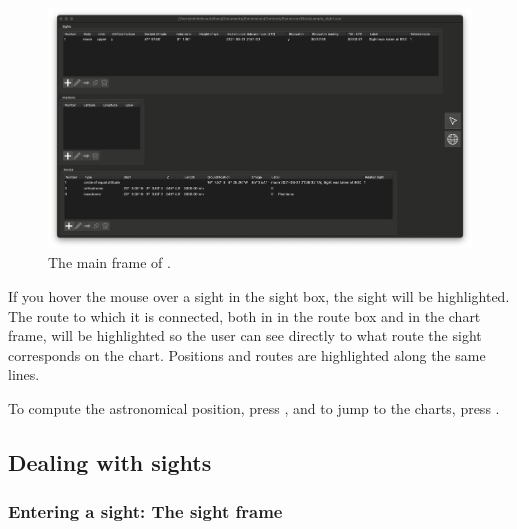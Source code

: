 \documentclass{ol-softwaremanual}
\begin{document}
\begin{figure}
  \centering
  \includegraphics[width=1\textwidth]{figures/list-frame.png}
  \caption{
    \label{fig-list-frame}
    The main frame of \thel. 
  }
  \end{figure}

If you hover the mouse over a sight in the sight box, the sight will be highlighted. The route to which it is connected, both in in the route box and in the chart frame, will be highlighted so the user can see directly to what route the sight corresponds on the chart. Positions and routes are highlighted along the same lines. 


To compute the astronomical position, press , and to jump to the charts, press .  

\subsection{Dealing with sights}

\subsubsection{Entering a sight: The sight frame}
\end{document}

